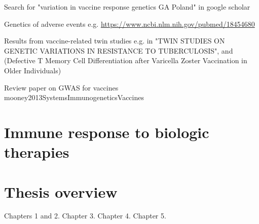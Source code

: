 Search for "variation in vaccine response genetics GA Poland" in google scholar

Genetics of adverse events e.g. \url{https://www.ncbi.nlm.nih.gov/pubmed/18454680}

Results from vaccine-related twin studies e.g. in "TWIN STUDIES ON GENETIC VARIATIONS IN RESISTANCE TO TUBERCULOSIS", and (Defective T Memory Cell Differentiation after Varicella Zoster Vaccination in Older Individuals)

Review paper on GWAS for vaccines mooney2013SystemsImmunogeneticsVaccines

\section{Immune response to biologic therapies}

\section{Thesis overview}

Chapters 1 and 2.
Chapter 3.
Chapter 4.
Chapter 5.
